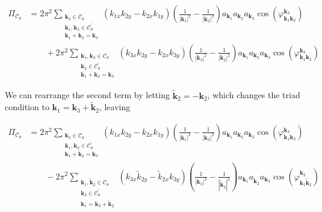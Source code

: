 \documentclass[9pt]{article}
\newcommand{\bfk}{\mathbf{k}}								%
\newcommand{\bfkn}[1]{\mathbf{k}_{#1}}								%
\begin{document}
\begin{align}
\Pi_{\mathcal{C}_\theta} &= 2 \pi^2 \sum_{\substack{\bfkn{3} \in \mathcal{C}_{\theta} \\ \bfkn{1},  \bfkn{2} \in \mathcal{C}_{\theta}^{'} \\ \bfkn{1} + \bfkn{2} = \bfkn{3}}} \left(k_{1 x} k_{2 y}-k_{2 x} k_{1 y}\right)\left(\frac{1}{\left|\mathbf{k}_{1}\right|^{2}}-\frac{1}{\left|\mathbf{k}_{2}\right|^{2}}\right) a_{\mathbf{k}_{1}} a_{\mathbf{k}_{2}} a_{\mathbf{k}_{3}} \cos \left(\varphi_{\mathbf{k}_{1} \mathbf{k}_{2}}^{\mathbf{k}_{3}}\right) \\
&\qquad + 2 \pi^2 \sum_{\substack{\bfkn{1}, \bfkn{2} \in \mathcal{C}_{\theta} \\ \bfkn{3} \in \mathcal{C}_{\theta}^{'} \\ \bfkn{1} + \bfkn{2} = \bfkn{3}}} \left(k_{3 x} k_{2 y}-k_{2 x} k_{3 y}\right)\left(\frac{1}{\left|\mathbf{k}_{3}\right|^{2}}-\frac{1}{\left|\mathbf{k}_{2}\right|^{2}}\right) a_{\mathbf{k}_{1}} a_{\mathbf{k}_{2}} a_{\mathbf{k}_{3}} \cos \left(\varphi_{\mathbf{k}_{1} \mathbf{k}_{2}}^{\mathbf{k}_{3}}\right)
\end{align}

We can rearrange the second term by letting $\tilde{\bfk}_{2} = - \bfkn{2}$, which changes the triad condition to $\bfkn{1} = \bfkn{3} + \tilde{\bfk}_{2}$, leaving

\begin{align}
\Pi_{\mathcal{C}_{\theta}} &= 2 \pi^2 \sum_{\substack{\bfkn{3} \in \mathcal{C}_{\theta} \\ \bfkn{1},  \bfkn{2} \in \mathcal{C}_{\theta}^{'} \\ \bfkn{1} + \bfkn{2} = \bfkn{3}}} \left(k_{1 x} k_{2 y}-k_{2 x} k_{1 y}\right)\left(\frac{1}{\left|\mathbf{k}_{1}\right|^{2}}-\frac{1}{\left|\mathbf{k}_{2}\right|^{2}}\right) a_{\mathbf{k}_{1}} a_{\mathbf{k}_{2}} a_{\mathbf{k}_{3}} \cos \left(\varphi_{\mathbf{k}_{1} \mathbf{k}_{2}}^{\mathbf{k}_{3}}\right) \\
&\qquad - 2 \pi^2 \sum_{\substack{\bfkn{1}, \tilde{\bfk}_{2} \in \mathcal{C}_{\theta} \\ \bfkn{3} \in \mathcal{C}_{\theta}^{'} \\ \bfkn{1}= \bfkn{3} + \tilde{\bfk}_{2}}} \left(k_{3 x} \tilde{k}_{2 y}-\tilde{k}_{2 x} k_{3 y}\right)\left(\frac{1}{\left|\mathbf{k}_{3}\right|^{2}}-\frac{1}{\left|\tilde{\mathbf{k}}_{2}\right|^{2}}\right) a_{\mathbf{k}_{1}} a_{\tilde{\mathbf{k}}_{2}} a_{\mathbf{k}_{3}} \cos \left(\varphi_{\mathbf{k}_{1} \tilde{\mathbf{k}}_{2}}^{\mathbf{k}_{3}}\right)
\end{align}
\end{document}
